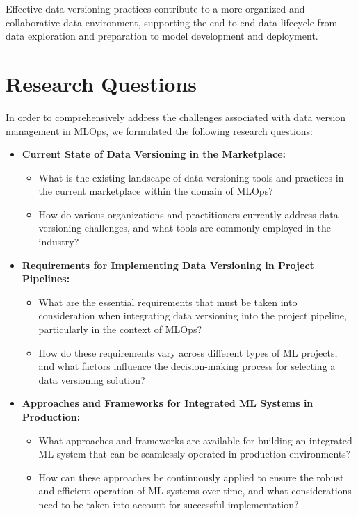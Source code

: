 \documentclass[12pt]{article}
\begin{document}
Effective data versioning practices contribute to a more organized and collaborative data environment, supporting the end-to-end data lifecycle from data exploration and preparation to model development and deployment.

\newpage

\section{Research Questions}

In order to comprehensively address the challenges associated with data version management in MLOps, we formulated the following research questions:

\begin{itemize}
    \item \textbf{Current State of Data Versioning in the Marketplace:}
    \begin{itemize}
        \item What is the existing landscape of data versioning tools and practices in the current marketplace within the domain of MLOps?
        \item How do various organizations and practitioners currently address data versioning challenges, and what tools are commonly employed in the industry?
    \end{itemize}

    \item \textbf{Requirements for Implementing Data Versioning in Project Pipelines:}
    \begin{itemize}
        \item What are the essential requirements that must be taken into consideration when integrating data versioning into the project pipeline, particularly in the context of MLOps?
        \item How do these requirements vary across different types of ML projects, and what factors influence the decision-making process for selecting a data versioning solution?
    \end{itemize}

    \item \textbf{Approaches and Frameworks for Integrated ML Systems in Production:}
    \begin{itemize}
        \item What approaches and frameworks are available for building an integrated ML system that can be seamlessly operated in production environments?
        \item How can these approaches be continuously applied to ensure the robust and efficient operation of ML systems over time, and what considerations need to be taken into account for successful implementation?
    \end{itemize}
\end{itemize}
\end{document}

